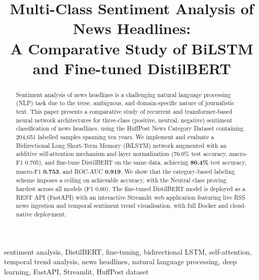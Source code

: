 \documentclass[conference]{IEEEtran}
\begin{document}
\title{Multi-Class Sentiment Analysis of News Headlines:\\
       A Comparative Study of BiLSTM and Fine-tuned DistilBERT}

\author{
}

\maketitle

\begin{abstract}
Sentiment analysis of news headlines is a challenging natural language
processing (NLP) task due to the terse, ambiguous, and domain-specific
nature of journalistic text. This paper presents a comparative study of
recurrent and transformer-based neural network architectures for
three-class (positive, neutral, negative) sentiment classification of
news headlines, using the HuffPost News Category Dataset containing
204,651 labelled samples spanning ten years. We implement and evaluate
a Bidirectional Long Short-Term Memory (BiLSTM) network augmented with
an additive self-attention mechanism and layer normalization (76.0\%
test accuracy, macro-F1 0.705), and fine-tune DistilBERT
\cite{sanh2019distilbert} on the same data, achieving \textbf{80.4\%}
test accuracy, macro-F1 \textbf{0.753}, and ROC-AUC \textbf{0.919}.
We show that the category-based labeling scheme imposes a ceiling on
achievable accuracy, with the Neutral class proving hardest across all
models (F1 0.60). The fine-tuned DistilBERT model is deployed as a
REST API (FastAPI) with an interactive Streamlit web application
featuring live RSS news ingestion and temporal sentiment trend
visualisation, with full Docker and cloud-native deployment.
\end{abstract}

\begin{IEEEkeywords}
sentiment analysis, DistilBERT, fine-tuning, bidirectional LSTM,
self-attention, temporal trend analysis, news headlines, natural language
processing, deep learning, FastAPI, Streamlit, HuffPost dataset
\end{IEEEkeywords}
\end{document}
